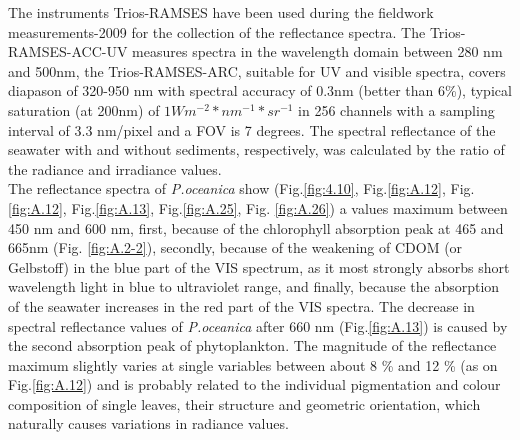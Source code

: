 \documentclass[11pt]{article}
\begin{document}
The instruments \ac{Trios-RAMSES} have been used during the fieldwork measurements-2009 for the collection of the reflectance spectra. The \ac{Trios-RAMSES}-ACC-\ac{UV} measures spectra in the wavelength domain between 280 nm and 500nm, the \ac{Trios-RAMSES}-ARC, suitable for UV and visible spectra, covers diapason of 320-950 nm with spectral accuracy of 0.3nm (better than 6\%), typical saturation (at 200nm) of  $1Wm^{-2}*nm^{-1}*sr^{-1}$ in 256 channels with a sampling interval of 3.3 nm/pixel and a \ac{FOV} is 7 degrees. The spectral reflectance of the seawater with and without sediments, respectively, was calculated by the ratio of the radiance and irradiance values. \\
The reflectance spectra of \textit{P.oceanica} show (Fig.\ref{fig:4.10}, Fig.\ref{fig:A.12}, Fig. \ref{fig:A.12}, Fig.\ref{fig:A.13}, Fig.\ref{fig:A.25}, Fig. \ref{fig:A.26}) a values maximum between 450 nm and 600 nm, first, because of the chlorophyll absorption peak at 465 and 665nm (Fig. \ref{fig:A.2-2})\label{chlorophyll}, secondly, because of the weakening of \ac{CDOM} (or Gelbstoff) in the blue part of the \ac{VIS} spectrum, as it most strongly absorbs short wavelength light in blue to ultraviolet range, and finally, because the absorption of the seawater increases in the red part of the \ac{VIS} spectra. The decrease in spectral reflectance values of \textit{P.oceanica} after 660 nm (Fig.\ref{fig:A.13}) is caused by the second absorption peak of phytoplankton. The magnitude of the reflectance maximum slightly varies at single variables between about 8 \% and 12 \% (as on Fig.\ref{fig:A.12}) and is probably related to the individual pigmentation and colour composition of single leaves, their structure and geometric orientation, which naturally causes variations in radiance values. \\
\end{document}

